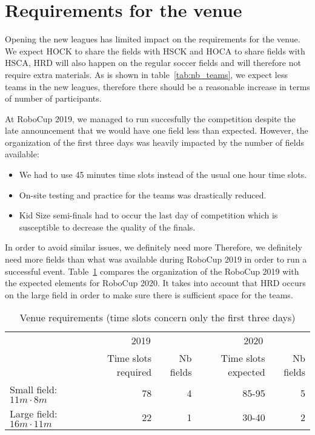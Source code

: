 \documentclass{article}
\begin{document}
\section{Requirements for the venue}

Opening the new leagues has limited impact on the requirements for the venue.
We expect HOCK to share the fields with HSCK and HOCA to share fields with HSCA,
HRD will also happen on the regular soccer fields and will therefore not require
extra materials.
As is shown in table~\ref{tab:nb_teams}, we expect less teams in the new
leagues,
therefore there should be a reasonable increase in terms of number of
participants.

At RoboCup 2019, we managed to run succesfully the competition despite the late
announcement that we would have one field less than expected.
However, the organization of the first three days was heavily impacted by the
number of fields available:
\begin{itemize}
\item We had to use 45 minutes time slots instead of the usual one hour
  time slots.
\item On-site testing and practice for the teams was drastically reduced.
\item Kid Size semi-finals had to occur the last day of competition which is
  susceptible to decrease the quality of the finals.
\end{itemize}
In order to avoid similar issues, we definitely need more
Therefore, we definitely need more fields than what was available during RoboCup
2019 in order to run a successful event.
Table~\ref{tab:requirements} compares the organization of the RoboCup 2019 with
the expected elements for RoboCup 2020.
It takes into account that HRD occurs on the large field in order to make sure
there is sufficient space for the teams.

\begin{table}[h]
  \centering
  \caption{\label{tab:requirements}Venue requirements (time slots concern only
    the first three days)}
  \begin{tabular}{l|r|r|r|r|}
    & \multicolumn{2}{c}{2019} & \multicolumn{2}{c}{2020}\\
    & Time slots required & Nb fields & Time slots expected & Nb fields\\
    \hline
    Small field: $11m \cdot 8m$ & 78 & 4 & 85-95 & 5\\
    Large field: $16m \cdot 11m$ & 22 & 1 & 30-40 & 2\\
  \end{tabular}
\end{table}
\end{document}
